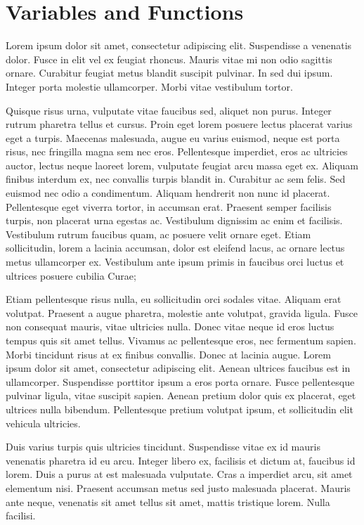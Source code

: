 \chapter{Variables and Functions}
\label{ch:02}

Lorem ipsum dolor sit amet, consectetur adipiscing elit. Suspendisse a venenatis dolor. Fusce in elit vel ex feugiat rhoncus. Mauris vitae mi non odio sagittis ornare. Curabitur feugiat metus blandit suscipit pulvinar. In sed dui ipsum. Integer porta molestie ullamcorper. Morbi vitae vestibulum tortor.

Quisque risus urna, vulputate vitae faucibus sed, aliquet non purus. Integer rutrum pharetra tellus et cursus. Proin eget lorem posuere lectus placerat varius eget a turpis. Maecenas malesuada, augue eu varius euismod, neque est porta risus, nec fringilla magna sem nec eros. Pellentesque imperdiet, eros ac ultricies auctor, lectus neque laoreet lorem, vulputate feugiat arcu massa eget ex. Aliquam finibus interdum ex, nec convallis turpis blandit in. Curabitur ac sem felis. Sed euismod nec odio a condimentum. Aliquam hendrerit non nunc id placerat. Pellentesque eget viverra tortor, in accumsan erat. Praesent semper facilisis turpis, non placerat urna egestas ac. Vestibulum dignissim ac enim et facilisis. Vestibulum rutrum faucibus quam, ac posuere velit ornare eget. Etiam sollicitudin, lorem a lacinia accumsan, dolor est eleifend lacus, ac ornare lectus metus ullamcorper ex. Vestibulum ante ipsum primis in faucibus orci luctus et ultrices posuere cubilia Curae;

Etiam pellentesque risus nulla, eu sollicitudin orci sodales vitae. Aliquam erat volutpat. Praesent a augue pharetra, molestie ante volutpat, gravida ligula. Fusce non consequat mauris, vitae ultricies nulla. Donec vitae neque id eros luctus tempus quis sit amet tellus. Vivamus ac pellentesque eros, nec fermentum sapien. Morbi tincidunt risus at ex finibus convallis. Donec at lacinia augue. Lorem ipsum dolor sit amet, consectetur adipiscing elit. Aenean ultrices faucibus est in ullamcorper. Suspendisse porttitor ipsum a eros porta ornare. Fusce pellentesque pulvinar ligula, vitae suscipit sapien. Aenean pretium dolor quis ex placerat, eget ultrices nulla bibendum. Pellentesque pretium volutpat ipsum, et sollicitudin elit vehicula ultricies.

Duis varius turpis quis ultricies tincidunt. Suspendisse vitae ex id mauris venenatis pharetra id eu arcu. Integer libero ex, facilisis et dictum at, faucibus id lorem. Duis a purus at est malesuada vulputate. Cras a imperdiet arcu, sit amet elementum nisi. Praesent accumsan metus sed justo malesuada placerat. Mauris ante neque, venenatis sit amet tellus sit amet, mattis tristique lorem. Nulla facilisi.

